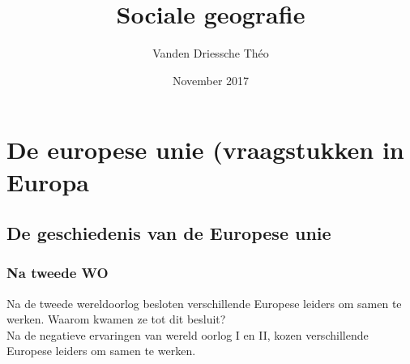 \documentclass{article}
\title{Sociale geografie}
\author{Vanden Driessche Théo }
\date{November 2017}
\begin{document}
\maketitle

\section{De europese unie (vraagstukken in Europa}
\subsection{De geschiedenis van de Europese unie}

\subsubsection{Na tweede WO}
Na de tweede wereldoorlog besloten verschillende Europese leiders om samen te werken. Waarom kwamen ze tot dit besluit?\\
Na de negatieve ervaringen van wereld oorlog I en II, kozen verschillende Europese leiders om samen te werken.
\end{document}
